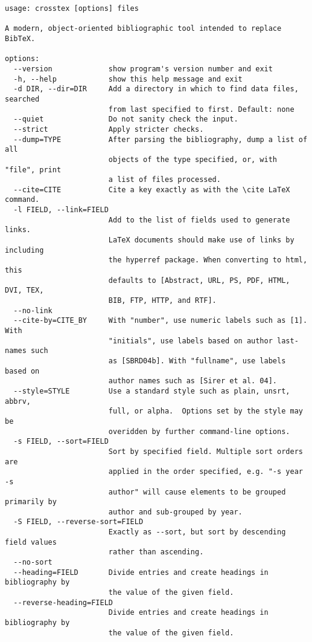 \documentclass{article}
\begin{document}
\begin{small}\begin{verbatim}
usage: crosstex [options] files

A modern, object-oriented bibliographic tool intended to replace BibTeX.

options:
  --version             show program's version number and exit
  -h, --help            show this help message and exit
  -d DIR, --dir=DIR     Add a directory in which to find data files, searched
                        from last specified to first. Default: none
  --quiet               Do not sanity check the input.
  --strict              Apply stricter checks.
  --dump=TYPE           After parsing the bibliography, dump a list of all
                        objects of the type specified, or, with "file", print
                        a list of files processed.
  --cite=CITE           Cite a key exactly as with the \cite LaTeX command.
  -l FIELD, --link=FIELD
                        Add to the list of fields used to generate links.
                        LaTeX documents should make use of links by including
                        the hyperref package. When converting to html, this
                        defaults to [Abstract, URL, PS, PDF, HTML, DVI, TEX,
                        BIB, FTP, HTTP, and RTF].
  --no-link             
  --cite-by=CITE_BY     With "number", use numeric labels such as [1]. With
                        "initials", use labels based on author last-names such
                        as [SBRD04b]. With "fullname", use labels based on
                        author names such as [Sirer et al. 04].
  --style=STYLE         Use a standard style such as plain, unsrt, abbrv,
                        full, or alpha.  Options set by the style may be
                        overidden by further command-line options.
  -s FIELD, --sort=FIELD
                        Sort by specified field. Multiple sort orders are
                        applied in the order specified, e.g. "-s year -s
                        author" will cause elements to be grouped primarily by
                        author and sub-grouped by year.
  -S FIELD, --reverse-sort=FIELD
                        Exactly as --sort, but sort by descending field values
                        rather than ascending.
  --no-sort             
  --heading=FIELD       Divide entries and create headings in bibliography by
                        the value of the given field.
  --reverse-heading=FIELD
                        Divide entries and create headings in bibliography by
                        the value of the given field.

\end{verbatim}
\end{small}
\end{document}
